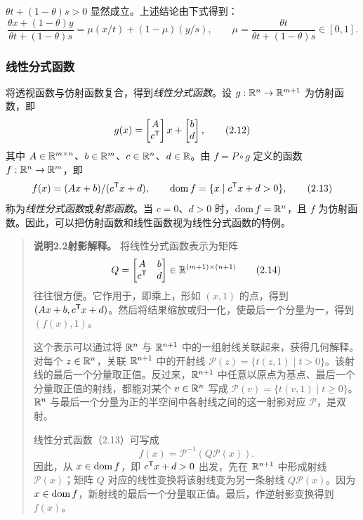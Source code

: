 $\theta t+(1-\theta)s>0$ 显然成立。上述结论由下式得到：
\[
 \frac{\theta x+(1-\theta)y}{\theta t+(1-\theta)s}
 =\mu(x/t)+(1-\mu)(y/s),
 \qquad\mu=\frac{\theta t}{\theta t+(1-\theta)s}\in[0,1].
\]

\subsubsection*{线性分式函数}
将透视函数与仿射函数复合，得到\emph{线性分式函数}。设 $g:\mathbb R^n\to\mathbb R^{m+1}$ 为仿射函数，即
\begin{equation}
 g(x)=\begin{bmatrix}A\\c^{\mathsf T}\end{bmatrix}x+
 \begin{bmatrix}b\\d\end{bmatrix},\tag{2.12}
\end{equation}
其中 $A\in\mathbb R^{m\times n}$、$b\in\mathbb R^m$、$c\in\mathbb R^n$、$d\in\mathbb R$。由 $f=P\circ g$ 定义的函数 $f:\mathbb R^n\to\mathbb R^m$，即
\begin{equation}
 f(x)=(Ax+b)/(c^{\mathsf T}x+d),\qquad
 \operatorname{dom} f=\{x\mid c^{\mathsf T}x+d>0\},\tag{2.13}
\end{equation}
称为\emph{线性分式函数}或\emph{射影函数}。当 $c=0$、$d>0$ 时，$\operatorname{dom} f=\mathbb R^n$，且 $f$ 为仿射函数。因此，可以把仿射函数和线性函数视为线性分式函数的特例。

\begin{quote}\textbf{说明2.2\quad 射影解释。}
将线性分式函数表示为矩阵
\begin{equation}
 Q=\begin{bmatrix}A&b\\c^{\mathsf T}&d\end{bmatrix}
 \in\mathbb R^{(m+1)\times(n+1)}\tag{2.14}
\end{equation}
往往很方便。它作用于，即乘上，形如 $(x,1)$ 的点，得到 $(Ax+b,c^{\mathsf T}x+d)$。然后将结果缩放或归一化，使最后一个分量为一，得到 $(f(x),1)$。

这个表示可以通过将 $\mathbb R^n$ 与 $\mathbb R^{n+1}$ 中的一组射线关联起来，获得几何解释。对每个 $z\in\mathbb R^n$，关联 $\mathbb R^{n+1}$ 中的开射线 $\mathcal P(z)=\{t(z,1)\mid t>0\}$。该射线的最后一个分量取正值。反过来，$\mathbb R^{n+1}$ 中任意以原点为基点、最后一个分量取正值的射线，都能对某个 $v\in\mathbb R^n$ 写成 $\mathcal P(v)=\{t(v,1)\mid t\ge0\}$。$\mathbb R^n$ 与最后一个分量为正的半空间中各射线之间的这一射影对应 $\mathcal P$，是双射。

线性分式函数（2.13）可写成
\[
 f(x)=\mathcal P^{-1}(Q\mathcal P(x)).
\]
因此，从 $x\in\operatorname{dom} f$，即 $c^{\mathsf T}x+d>0$ 出发，先在 $\mathbb R^{n+1}$ 中形成射线 $\mathcal P(x)$；矩阵 $Q$ 对应的线性变换将该射线变为另一条射线 $Q\mathcal P(x)$。因为 $x\in\operatorname{dom} f$，新射线的最后一个分量取正值。最后，作逆射影变换得到 $f(x)$。
\end{quote}


